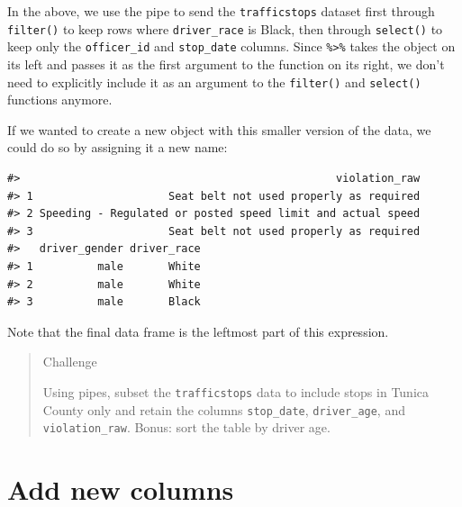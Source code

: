 \documentclass[]{book}
\newenvironment{Shaded}{\begin{snugshade}}{\end{snugshade}}
\newcommand{\DecValTok}[1]{\textcolor[rgb]{0.00,0.00,0.81}{#1}}
\newcommand{\KeywordTok}[1]{\textcolor[rgb]{0.13,0.29,0.53}{\textbf{#1}}}
\newcommand{\NormalTok}[1]{#1}
\newcommand{\OperatorTok}[1]{\textcolor[rgb]{0.81,0.36,0.00}{\textbf{#1}}}
\newcommand{\StringTok}[1]{\textcolor[rgb]{0.31,0.60,0.02}{#1}}
\begin{document}
In the above, we use the pipe to send the \texttt{trafficstops} dataset first through
\texttt{filter()} to keep rows where \texttt{driver\_race} is Black, then through \texttt{select()}
to keep only the \texttt{officer\_id} and \texttt{stop\_date} columns. Since \texttt{\%\textgreater{}\%} takes
the object on its left and passes it as the first argument to the function on
its right, we don't need to explicitly include it as an argument to the
\texttt{filter()} and \texttt{select()} functions anymore.

If we wanted to create a new object with this smaller version of the data, we
could do so by assigning it a new name:

\begin{Shaded}
\end{Shaded}

\begin{verbatim}
#>                                                 violation_raw
#> 1                     Seat belt not used properly as required
#> 2 Speeding - Regulated or posted speed limit and actual speed
#> 3                     Seat belt not used properly as required
#>   driver_gender driver_race
#> 1          male       White
#> 2          male       White
#> 3          male       Black
\end{verbatim}

Note that the final data frame is the leftmost part of this expression.

\begin{quote}
Challenge

Using pipes, subset the \texttt{trafficstops} data to include stops in Tunica County only and retain the columns \texttt{stop\_date}, \texttt{driver\_age}, and \texttt{violation\_raw}. Bonus: sort the table by driver age.
\end{quote}

\hypertarget{add-new-columns}{%
\section{Add new columns}\label{add-new-columns}}
\end{document}
